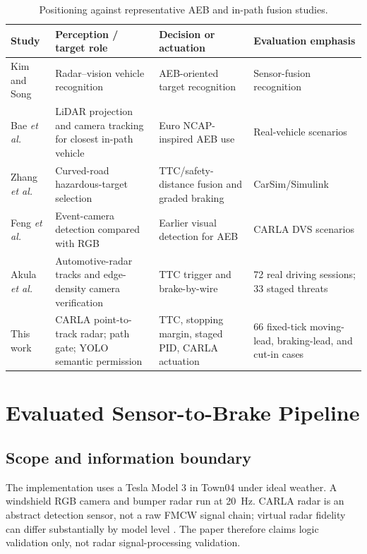 \documentclass[conference]{IEEEtran}
\begin{document}
\begin{table}[t]
\caption{Positioning against representative AEB and in-path fusion studies.}
\label{tab:positioning}
\centering
\footnotesize
\begin{tabular}{p{}p{}p{}p{}}
\toprule
Study & Perception / target role & Decision or actuation & Evaluation emphasis \\
\midrule
Kim and Song \cite{kim2013vehicle} & Radar--vision vehicle recognition & AEB-oriented target recognition & Sensor-fusion recognition \\
Bae \emph{et al.} \cite{bae2021cipv} & LiDAR projection and camera tracking for closest in-path vehicle & Euro NCAP-inspired AEB use & Real-vehicle scenarios \\
Zhang \emph{et al.} \cite{zhang2023curved} & Curved-road hazardous-target selection & TTC/safety-distance fusion and graded braking & CarSim/Simulink \\
Feng \emph{et al.} \cite{feng2025dvs} & Event-camera detection compared with RGB & Earlier visual detection for AEB & CARLA DVS scenarios \\
Akula \emph{et al.} \cite{akula2026radarguided} & Automotive-radar tracks and edge-density camera verification & TTC trigger and brake-by-wire & 72 real driving sessions; 33 staged threats \\
This work & CARLA point-to-track radar; path gate; YOLO semantic permission & TTC, stopping margin, staged PID, CARLA actuation & 66 fixed-tick moving-lead, braking-lead, and cut-in cases \\
\bottomrule
\end{tabular}
\end{table}

\section{Evaluated Sensor-to-Brake Pipeline}
\subsection{Scope and information boundary}
The implementation uses a Tesla Model 3 in Town04 under ideal weather. A
windshield RGB camera and bumper radar run at 20~Hz. CARLA radar is an abstract
detection sensor, not a raw FMCW signal chain; virtual radar fidelity can differ
substantially by model level \cite{magosi2022radar}. The paper therefore claims
logic validation only, not radar signal-processing validation.
\end{document}
